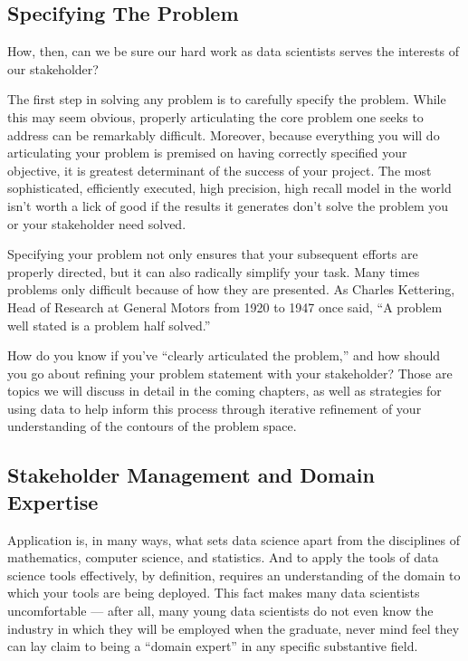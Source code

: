 \documentclass[letterpaper,10pt,english]{jupyterBook}
\begin{document}
\subsection{Specifying The Problem}
\label{\detokenize{10_introduction/20_solving_problems:specifying-the-problem}}
\sphinxAtStartPar
How, then, can we be sure our hard work as data scientists serves the interests of our stakeholder?

\sphinxAtStartPar
The first step in solving any problem is  to carefully specify the problem. While this may seem obvious, properly articulating the core problem one seeks to address can be remarkably difficult. Moreover, because everything you will do  articulating your problem is premised on having correctly specified your objective, it is  greatest determinant of the success of your project. The most sophisticated, efficiently executed, high precision, high recall model in the world isn’t worth a lick of good if the results it generates don’t solve the problem you or your stakeholder need solved.

\sphinxAtStartPar
Specifying your problem not only ensures that your subsequent efforts are properly directed, but it can also radically simplify your task. Many times problems only  difficult because of how they are presented. As Charles Kettering, Head of Research at General Motors from 1920 to 1947 once said, “A problem well stated is a problem half solved.”

\sphinxAtStartPar
How do you know if you’ve “clearly articulated the problem,” and how should you go about refining your problem statement with your stakeholder? Those are topics we will discuss in detail in the coming chapters, as well as strategies for using data to help inform this process through iterative refinement of your understanding of the contours of the problem space.


\subsection{Stakeholder Management and Domain Expertise}
\label{\detokenize{10_introduction/20_solving_problems:stakeholder-management-and-domain-expertise}}
\sphinxAtStartPar
Application is, in many ways, what sets data science apart from the disciplines of mathematics, computer science, and statistics. And to apply the tools of data science tools effectively, by definition, requires an understanding of the domain to which your tools are being deployed. This fact makes many data scientists uncomfortable — after all, many young data scientists do not even know the industry in which they will be employed when the graduate, never mind feel they can lay claim to being a “domain expert” in any specific substantive field.
\end{document}
